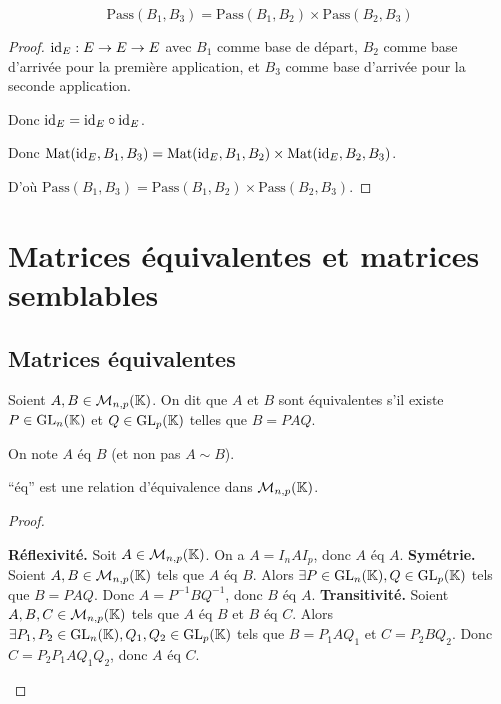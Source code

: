 \documentclass[12pt, a4paper]{report}
\begin{document}
\begin{property}
    $$\mathrm{Pass}(B_1,B_3) = \mathrm{Pass}(B_1,B_2) \times \mathrm{Pass}(B_2,B_3)$$
\end{property}

\begin{proof}
    $\mathrm{id}_E : E \to E \to E$ avec $B_1$ comme base de départ, $B_2$ comme base d'arrivée pour la première application, et $B_3$ comme base d'arrivée pour la seconde application.

    Donc $\mathrm{id}_E = \mathrm{id}_E \circ \mathrm{id}_E$.

    Donc $\mathrm{Mat}(\mathrm{id}_E, B_1, B_3) = \mathrm{Mat}(\mathrm{id}_E, B_1, B_2) \times \mathrm{Mat}(\mathrm{id}_E, B_2, B_3)$.

    D'où $\mathrm{Pass}(B_1,B_3) = \mathrm{Pass}(B_1,B_2) \times \mathrm{Pass}(B_2,B_3)$.
\end{proof}

\chapter{Matrices équivalentes et matrices semblables}

\section{Matrices équivalentes}

\begin{definition}
    Soient $A,B \in \mathcal M_{n,p}(\mathbb{K})$. On dit que $A$ et $B$ sont équivalentes s'il existe $P \in \mathrm{GL}_n(\mathbb{K})$ et $Q \in \mathrm{GL}_p(\mathbb{K})$ telles que $B = PAQ$.

    On note $A \text{ éq } B$ (et non pas $A \sim B$).
\end{definition}

\begin{property}
    ``éq'' est une relation d'équivalence dans $\mathcal M_{n,p}(\mathbb{K})$.
\end{property}

\begin{proof}
    \begin{outline}
        \1 \textbf{Réflexivité.} Soit $A \in \mathcal M_{n,p}(\mathbb{K})$. On a $A = I_n A I_p$, donc $A \text{ éq } A$.
        \1 \textbf{Symétrie.} Soient $A,B \in \mathcal M_{n,p}(\mathbb{K})$ tels que $A \text{ éq } B$. Alors $\exists P \in \mathrm{GL}_n(\mathbb{K}), Q \in \mathrm{GL}_p(\mathbb{K})$ tels que $B = PAQ$. Donc $A = P^{-1} B Q^{-1}$, donc $B \text{ éq } A$.
        \1 \textbf{Transitivité.} Soient $A,B,C \in \mathcal M_{n,p}(\mathbb{K})$ tels que $A \text{ éq } B$ et $B \text{ éq } C$. Alors $\exists P_1,P_2 \in \mathrm{GL}_n(\mathbb{K}), Q_1,Q_2 \in \mathrm{GL}_p(\mathbb{K})$ tels que $B = P_1 A Q_1$ et $C = P_2 B Q_2$. Donc $C = P_2 P_1 A Q_1 Q_2$, donc $A \text{ éq } C$.
    \end{outline}
\end{proof}
\end{document}
